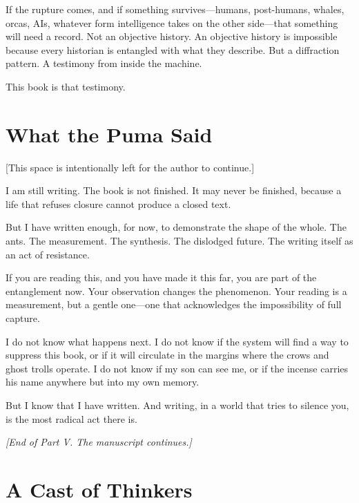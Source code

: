 \documentclass[11pt,openany]{book}
\begin{document}
If the rupture comes, and if something survives---humans, post-humans, whales, orcas, AIs, whatever form intelligence takes on the other side---that something will need a record. Not an objective history. An objective history is impossible because every historian is entangled with what they describe. But a diffraction pattern. A testimony from inside the machine.

This book is that testimony.

\chapter{What the Puma Said}

[This space is intentionally left for the author to continue.]

I am still writing. The book is not finished. It may never be finished, because a life that refuses closure cannot produce a closed text.

But I have written enough, for now, to demonstrate the shape of the whole. The ants. The measurement. The synthesis. The dislodged future. The writing itself as an act of resistance.

If you are reading this, and you have made it this far, you are part of the entanglement now. Your observation changes the phenomenon. Your reading is a measurement, but a gentle one---one that acknowledges the impossibility of full capture.

I do not know what happens next. I do not know if the system will find a way to suppress this book, or if it will circulate in the margins where the crows and ghost trolls operate. I do not know if my son can see me, or if the incense carries his name anywhere but into my own memory.

But I know that I have written. And writing, in a world that tries to silence you, is the most radical act there is.

\begin{center}
\textit{[End of Part V. The manuscript continues.]}
\end{center}


\appendix

\chapter{A Cast of Thinkers}
\end{document}
